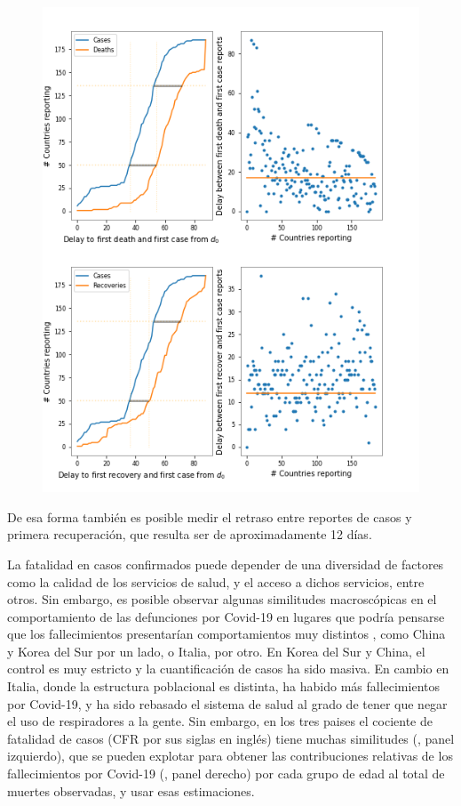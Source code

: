 \begin{figure}[h]
\begin{minipage}{0.4\textwidth}
\includegraphics[width=\textwidth]
{../tsam_Covid19_analysis/figures/tsam_Covid19_JHU_delays_caseDeaths}
\end{minipage}%
\end{figure}
De esa forma también es posible medir el retraso entre reportes de casos y primera recuperación, que resulta ser de aproximadamente 12 días. 

\bigskip
La fatalidad en casos confirmados puede depender de una diversidad de factores como la calidad de los servicios de salud, y el acceso a dichos servicios, entre otros. 
Sin embargo, es posible observar algunas similitudes macroscópicas en el comportamiento de las defunciones por Covid-19 en lugares que podría pensarse que los fallecimientos presentarían comportamientos muy distintos , como China y Korea del Sur por un lado, o Italia, por otro. 
En Korea del Sur y China, el control es muy estricto y la cuantificación de casos ha sido masiva. 
En cambio en Italia, donde la estructura poblacional es distinta, ha habido más fallecimientos por Covid-19, y ha sido rebasado el sistema de salud al grado de tener que negar el uso de respiradores a la gente. 
Sin embargo, en los tres paises el cociente de fatalidad de casos (CFR por sus siglas en inglés) tiene muchas similitudes (, panel izquierdo), que se pueden explotar para obtener las contribuciones relativas de los fallecimientos por Covid-19 (, panel derecho) por cada grupo de edad al total de muertes observadas, y usar esas estimaciones. 


